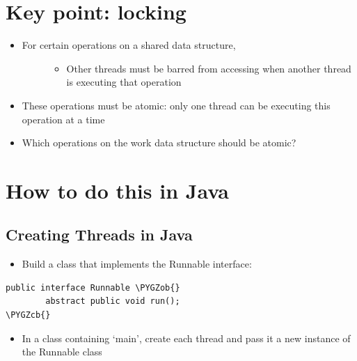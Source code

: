 \documentclass[letterpaper,10pt,openany,oneside]{sphinxmanual}
\def\PYGZob{\char`\{}
\def\PYGZcb{\char`\}}
\begin{document}
\section{Key point: locking}
\label{URLSpider/URLSpider:key-point-locking}\begin{itemize}
\item {} \begin{description}
\item[{For certain operations on a shared data structure,}] \leavevmode\begin{itemize}
\item {} 
Other threads must be barred from accessing when another thread is executing that operation

\end{itemize}

\end{description}

\item {} 
These operations must be atomic: only one thread can be executing this operation at a time

\item {} 
Which operations on the work data structure should be atomic?

\end{itemize}


\section{How to do this in Java}
\label{URLSpider/URLSpider:how-to-do-this-in-java}

\subsection{Creating Threads in Java}
\label{URLSpider/URLSpider:creating-threads-in-java}\begin{itemize}
\item {} 
Build a class that implements the Runnable interface:

\end{itemize}

\begin{Verbatim}[commandchars=\\\{\}]
public interface Runnable \PYGZob{}
        abstract public void run();
\PYGZcb{}
\end{Verbatim}
\begin{itemize}
\item {} 
In a class containing ‘main’, create each thread and pass it a new instance of the Runnable class

\end{itemize}
\end{document}

